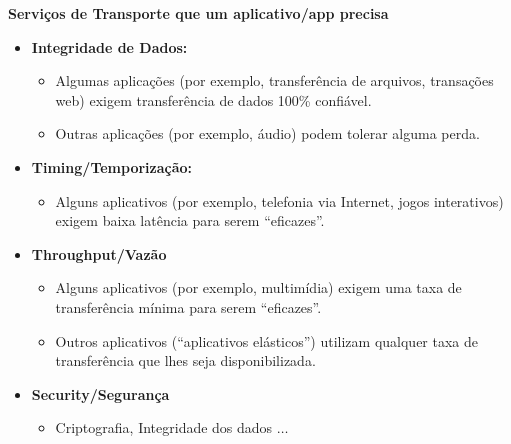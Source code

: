     \textbf{Serviços de Transporte que um aplicativo/app precisa}
    \begin{itemize}[left=0.5cm, align=left, nosep]    
        \item \textbf{Integridade de Dados:}
        \begin{itemize}[left=0.5cm, nosep, label=$\hookrightarrow$]
            \item Algumas aplicações (por exemplo, transferência de arquivos, transações web) exigem transferência de dados 100\% confiável.
            \item Outras aplicações (por exemplo, áudio) podem tolerar alguma perda.
        \end{itemize}  
        \item \textbf{Timing/Temporização:}
        \begin{itemize}[left=0.5cm, nosep, label=$\hookrightarrow$]
            \item Alguns aplicativos (por exemplo, telefonia via Internet, jogos interativos) exigem baixa latência para serem ``eficazes''.
        \end{itemize}
        \item \textbf{Throughput/Vazão}
        \begin{itemize}[left=0.5cm, nosep, label=$\hookrightarrow$]
            \item Alguns aplicativos (por exemplo, multimídia) exigem uma taxa de transferência mínima para serem ``eficazes''.
            \item Outros aplicativos (``aplicativos elásticos'') utilizam qualquer taxa de transferência que lhes seja disponibilizada.
        \end{itemize}
        \item \textbf{Security/Segurança}
        \begin{itemize}[left=0.5cm, nosep, label=$\hookrightarrow$]
            \item Criptografia, Integridade dos dados $\ldots$
        \end{itemize}
    \end{itemize}

